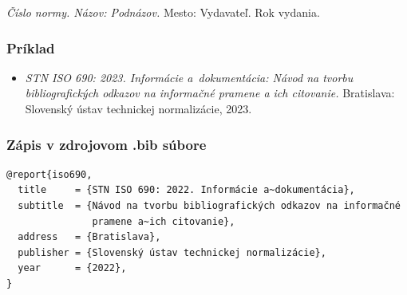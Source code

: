 \begin{trivlist}
\item \textit{Číslo normy. Názov: Podnázov.} Mesto: Vydavateľ. Rok vydania.
\end{trivlist}

\subsubsection*{\normalsize Príklad}
\begin{itemize}
  \item \textit{STN ISO 690: 2023. Informácie a~dokumentácia: Návod na tvorbu bibliografických odkazov na informačné pramene a ich citovanie.} Bratislava: Slovenský ústav technickej normalizácie, 2023.
\end{itemize}

\subsubsection*{\normalsize Zápis v zdrojovom .bib súbore}
\begin{verbatim}
@report{iso690,
  title     = {STN ISO 690: 2022. Informácie a~dokumentácia},
  subtitle  = {Návod na tvorbu bibliografických odkazov na informačné
               pramene a~ich citovanie},
  address   = {Bratislava},
  publisher = {Slovenský ústav technickej normalizácie},
  year      = {2022},
}
\end{verbatim}

